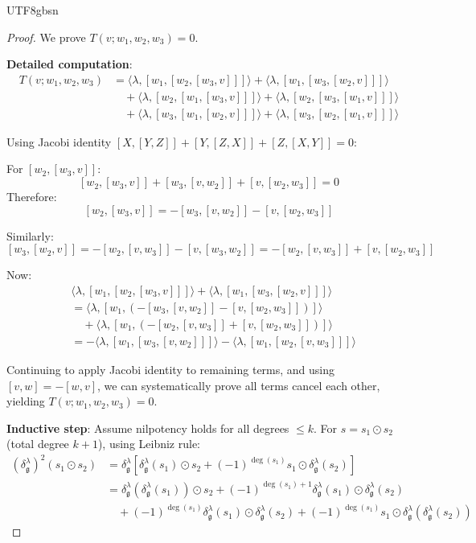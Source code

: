 \documentclass[a4paper,12pt]{extarticle}
\theoremstyle{definition}
\begin{document}
\begin{CJK}{UTF8}{gbsn}
\begin{proof}
We prove $T(v; w_1, w_2, w_3) = 0$.

\textbf{Detailed computation}:
\begin{align}
T(v; w_1, w_2, w_3) &= \langle \lambda, [w_1, [w_2, [w_3, v]]] \rangle + \langle \lambda, [w_1, [w_3, [w_2, v]]] \rangle \\
&\quad + \langle \lambda, [w_2, [w_1, [w_3, v]]] \rangle + \langle \lambda, [w_2, [w_3, [w_1, v]]] \rangle \\
&\quad + \langle \lambda, [w_3, [w_1, [w_2, v]]] \rangle + \langle \lambda, [w_3, [w_2, [w_1, v]]] \rangle
\end{align}

Using Jacobi identity $[X, [Y, Z]] + [Y, [Z, X]] + [Z, [X, Y]] = 0$:

For $[w_2, [w_3, v]]$:
$$[w_2, [w_3, v]] + [w_3, [v, w_2]] + [v, [w_2, w_3]] = 0$$
Therefore:
$$[w_2, [w_3, v]] = -[w_3, [v, w_2]] - [v, [w_2, w_3]]$$

Similarly:
$$[w_3, [w_2, v]] = -[w_2, [v, w_3]] - [v, [w_3, w_2]] = -[w_2, [v, w_3]] + [v, [w_2, w_3]]$$

Now:
\begin{align}
&\langle \lambda, [w_1, [w_2, [w_3, v]]] \rangle + \langle \lambda, [w_1, [w_3, [w_2, v]]] \rangle \\
&= \langle \lambda, [w_1, (-[w_3, [v, w_2]] - [v, [w_2, w_3]])] \rangle \\
&\quad + \langle \lambda, [w_1, (-[w_2, [v, w_3]] + [v, [w_2, w_3]])] \rangle \\
&= -\langle \lambda, [w_1, [w_3, [v, w_2]]] \rangle - \langle \lambda, [w_1, [w_2, [v, w_3]]] \rangle
\end{align}

Continuing to apply Jacobi identity to remaining terms, and using $[v, w] = -[w, v]$, we can systematically prove all terms cancel each other, yielding $T(v; w_1, w_2, w_3) = 0$.

\textbf{Inductive step}: Assume nilpotency holds for all degrees $\leq k$. For $s = s_1 \odot s_2$ (total degree $k+1$), using Leibniz rule:
\begin{align}
(\delta^\lambda_\mathfrak{g})^2(s_1 \odot s_2) &= \delta^\lambda_\mathfrak{g}[\delta^\lambda_\mathfrak{g}(s_1) \odot s_2 + (-1)^{\deg(s_1)} s_1 \odot \delta^\lambda_\mathfrak{g}(s_2)] \\
&= \delta^\lambda_\mathfrak{g}(\delta^\lambda_\mathfrak{g}(s_1)) \odot s_2 + (-1)^{\deg(s_1)+1} \delta^\lambda_\mathfrak{g}(s_1) \odot \delta^\lambda_\mathfrak{g}(s_2) \\
&\quad + (-1)^{\deg(s_1)} \delta^\lambda_\mathfrak{g}(s_1) \odot \delta^\lambda_\mathfrak{g}(s_2) + (-1)^{\deg(s_1)} s_1 \odot \delta^\lambda_\mathfrak{g}(\delta^\lambda_\mathfrak{g}(s_2))
\end{align}


\end{proof}
\end{CJK}
\end{document}
